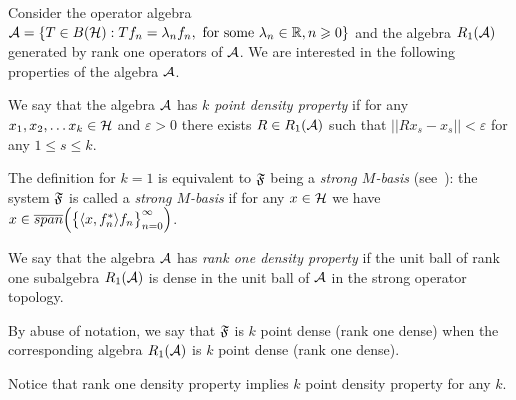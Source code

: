 \documentclass[12pt]{amsart}
\theoremstyle{case}
\begin{document}
    Consider the operator algebra $\cal{A} = \{T\in B(\cal{H}): Tf_n = \lambda_n f_n, \text{ for some } \lambda_n \in \mathbb{R}, n \geq 0\}$
      and the algebra $R_1(\cal{A})$ generated by rank one operators of $\cal{A}$.
    We are interested in the following properties of the algebra $\cal{A}$.
    \begin{definition}
      \label{kpd}
      We say that the algebra $\cal{A}$ has \emph{$k$ point density property} if for any $x_1, x_2,\dots x_k \in \cal{H}$ and $\varepsilon > 0$
        there exists $R\in R_1(\cal{A})$ such that $||Rx_s - x_s|| < \varepsilon$ for any $1 \leq s \leq k$.
    \end{definition}
    The definition for $k=1$ is equivalent to $\fsys$ being a \emph{strong $M$-basis} (see~\cite{katavolos}):
      the system $\fsys$ is called a \emph{strong $M$-basis} if for any $x\in\cal{H}$ we have $x \in \overline{span}\Big(\big\{\inner{x}{f^*_n}f_n\big\}_{n=0}^\infty\Big)$.
    \begin{definition}
      \label{r1d}
      We say that the algebra $\cal{A}$ has \emph{rank one density property} if the unit ball of rank one subalgebra $R_1(\cal{A})$
        is dense in the unit ball of $\cal{A}$ in the strong operator topology.
    \end{definition}
    By abuse of notation, we say that $\fsys$ is $k$ point dense (rank one dense)
      when the corresponding algebra $R_1(\cal{A})$ is $k$ point dense (rank one dense).

    Notice that rank one density property implies $k$ point density property for any $k$.

\end{document}
